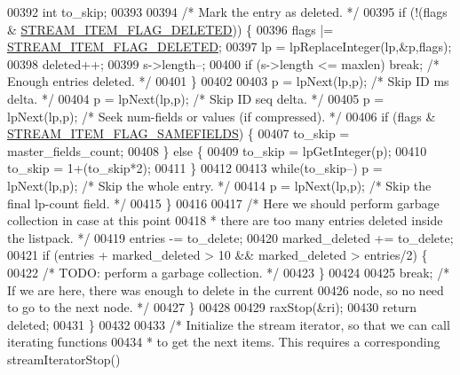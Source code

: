 \begin{DoxyCode}
{00392             \textcolor{keywordtype}{int} to\_skip;
00393 
00394             \textcolor{comment}{/* Mark the entry as deleted. */}
00395             \textcolor{keywordflow}{if} (!(flags & \hyperlink{t__stream_8c_ad2bde2408044756f3f418ae3c72e575f}{STREAM\_ITEM\_FLAG\_DELETED})) \{
00396                 flags |= \hyperlink{t__stream_8c_ad2bde2408044756f3f418ae3c72e575f}{STREAM\_ITEM\_FLAG\_DELETED};
00397                 lp = lpReplaceInteger(lp,&p,flags);
00398                 deleted++;
00399                 s->length--;
00400                 \textcolor{keywordflow}{if} (s->length <= maxlen) \textcolor{keywordflow}{break}; \textcolor{comment}{/* Enough entries deleted. */}
00401             \}
00402 
00403             p = lpNext(lp,p); \textcolor{comment}{/* Skip ID ms delta. */}
00404             p = lpNext(lp,p); \textcolor{comment}{/* Skip ID seq delta. */}
00405             p = lpNext(lp,p); \textcolor{comment}{/* Seek num-fields or values (if compressed). */}
00406             \textcolor{keywordflow}{if} (flags & \hyperlink{t__stream_8c_a6977b456a646762a7650d432a06dc6c5}{STREAM\_ITEM\_FLAG\_SAMEFIELDS}) \{
00407                 to\_skip = master\_fields\_count;
00408             \} \textcolor{keywordflow}{else} \{
00409                 to\_skip = lpGetInteger(p);
00410                 to\_skip = 1+(to\_skip*2);
00411             \}
00412 
00413             \textcolor{keywordflow}{while}(to\_skip--) p = lpNext(lp,p); \textcolor{comment}{/* Skip the whole entry. */}
00414             p = lpNext(lp,p); \textcolor{comment}{/* Skip the final lp-count field. */}
00415         \}
00416 
00417         \textcolor{comment}{/* Here we should perform garbage collection in case at this point}
00418 \textcolor{comment}{         * there are too many entries deleted inside the listpack. */}
00419         entries -= to\_delete;
00420         marked\_deleted += to\_delete;
00421         \textcolor{keywordflow}{if} (entries + marked\_deleted > 10 && marked\_deleted > entries/2) \{
00422             \textcolor{comment}{/* TODO: perform a garbage collection. */}
00423         \}
00424 
00425         \textcolor{keywordflow}{break}; \textcolor{comment}{/* If we are here, there was enough to delete in the current}
00426 \textcolor{comment}{                  node, so no need to go to the next node. */}
00427     \}
00428 
00429     raxStop(&ri);
00430     \textcolor{keywordflow}{return} deleted;
00431 \}
00432 
00433 \textcolor{comment}{/* Initialize the stream iterator, so that we can call iterating functions}
00434 \textcolor{comment}{ * to get the next items. This requires a corresponding streamIteratorStop()}
}
\end{DoxyCode}
